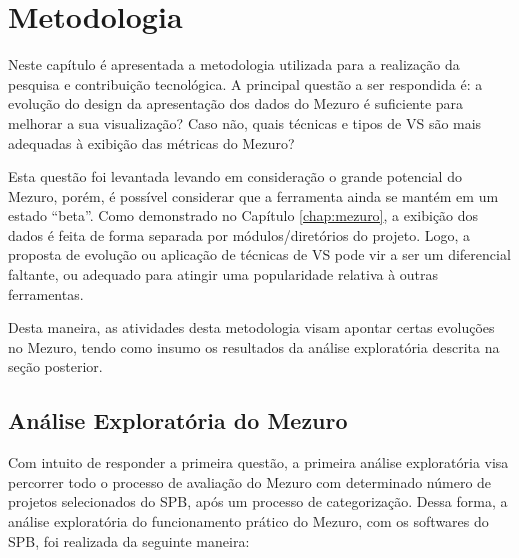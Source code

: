 \chapter{Metodologia}\label{chap:metodologia}

Neste capítulo é apresentada a metodologia utilizada para a
realização da pesquisa e contribuição tecnológica. A principal questão
a ser respondida é: a evolução do design da apresentação dos dados do Mezuro
é suficiente para melhorar a sua visualização? Caso não, quais técnicas e
tipos de VS são mais adequadas à exibição das métricas do Mezuro?

Esta questão foi levantada levando em consideração o grande potencial do Mezuro,
porém, é possível considerar que a ferramenta ainda se mantém em um estado
``beta''. Como demonstrado no Capítulo \ref{chap:mezuro}, a exibição dos dados é
feita de forma separada por módulos/diretórios do projeto. Logo, a proposta de
evolução ou aplicação de técnicas de VS pode vir a ser um diferencial faltante,
ou adequado para atingir uma popularidade relativa à outras ferramentas.

Desta maneira, as atividades desta metodologia visam apontar certas
evoluções no Mezuro, tendo como insumo os resultados da análise exploratória
descrita na seção posterior.

\section{Análise Exploratória do Mezuro}

Com intuito de responder a primeira questão, a primeira análise exploratória
visa percorrer todo o processo de avaliação do Mezuro com determinado número
de projetos selecionados do SPB, após um processo de categorização.
%
Dessa forma, a análise exploratória do funcionamento prático do Mezuro, com os
softwares do SPB, foi realizada da seguinte maneira:

